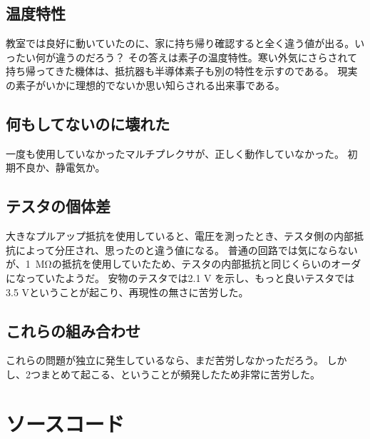 \documentclass{ltjsreport}
\begin{document}
\section{温度特性}
教室では良好に動いていたのに、家に持ち帰り確認すると全く違う値が出る。いったい何が違うのだろう？
その答えは素子の温度特性。寒い外気にさらされて持ち帰ってきた機体は、抵抗器も半導体素子も別の特性を示すのである。
現実の素子がいかに理想的でないか思い知らされる出来事である。

\section{何もしてないのに壊れた}
一度も使用していなかったマルチプレクサが、正しく動作していなかった。
初期不良か、静電気か。

\section{テスタの個体差}
大きなプルアップ抵抗を使用していると、電圧を測ったとき、テスタ側の内部抵抗によって分圧され、思ったのと違う値になる。
普通の回路では気にならないが、\SI{1}{\Mohm}の抵抗を使用していたため、テスタの内部抵抗と同じくらいのオーダになっていたようだ。
安物のテスタでは2.1 V を示し、もっと良いテスタでは3.5 Vということが起こり、再現性の無さに苦労した。

\section{これらの組み合わせ}
これらの問題が独立に発生しているなら、まだ苦労しなかっただろう。
しかし、2つまとめて起こる、ということが頻発したため非常に苦労した。

\chapter{ソースコード} \label{cha:code}


\end{document}
